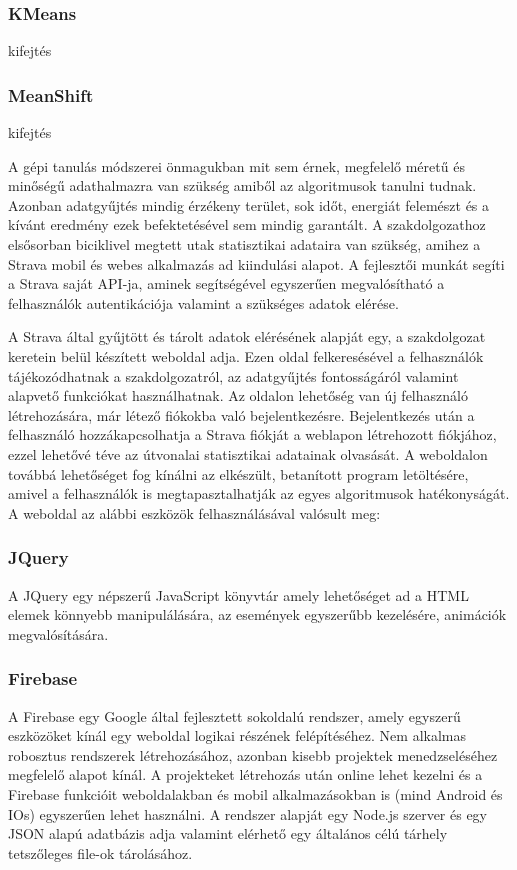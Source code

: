 \subsubsection{KMeans}
\TODO kifejtés

\subsubsection{MeanShift}
\TODO kifejtés




A gépi tanulás módszerei önmagukban mit sem érnek, megfelelő méretű és minőségű adathalmazra van szükség amiből az algoritmusok tanulni tudnak. Azonban adatgyűjtés mindig érzékeny terület, sok időt, energiát felemészt és a kívánt eredmény ezek befektetésével sem mindig garantált. A szakdolgozathoz elsősorban biciklivel megtett utak statisztikai adataira van szükség, amihez a Strava mobil és webes alkalmazás ad kiindulási alapot. A fejlesztői munkát segíti a Strava saját API-ja, aminek segítségével egyszerűen megvalósítható a felhasználók autentikációja valamint a szükséges adatok elérése. 

A Strava által gyűjtött és tárolt adatok elérésének alapját egy, a szakdolgozat keretein belül készített weboldal adja. Ezen oldal felkeresésével a felhasználók tájékozódhatnak a szakdolgozatról, az adatgyűjtés fontosságáról valamint alapvető funkciókat használhatnak. Az oldalon lehetőség van új felhasználó létrehozására, már létező fiókokba való bejelentkezésre. Bejelentkezés után a felhasználó hozzákapcsolhatja a Strava fiókját a weblapon létrehozott fiókjához, ezzel lehetővé téve az útvonalai statisztikai adatainak olvasását. A weboldalon továbbá lehetőséget fog kínálni az elkészült, betanított program letöltésére, amivel a felhasználók is megtapasztalhatják az egyes algoritmusok hatékonyságát. A weboldal az alábbi eszközök felhasználásával valósult meg:

\subsubsection{JQuery}
A JQuery egy népszerű JavaScript könyvtár amely lehetőséget ad a HTML elemek könnyebb manipulálására, az események egyszerűbb kezelésére, animációk megvalósítására.

\subsubsection{Firebase}
A Firebase egy Google által fejlesztett sokoldalú rendszer, amely egyszerű eszközöket kínál egy weboldal logikai részének felépítéséhez. Nem alkalmas robosztus rendszerek létrehozásához, azonban kisebb projektek menedzseléséhez megfelelő alapot kínál. A projekteket létrehozás után online lehet kezelni és a Firebase funkcióit weboldalakban és mobil alkalmazásokban is (mind Android és IOs) egyszerűen lehet használni. A rendszer alapját egy Node.js szerver és egy JSON alapú adatbázis adja valamint elérhető egy általános célú tárhely tetszőleges file-ok tárolásához. 

